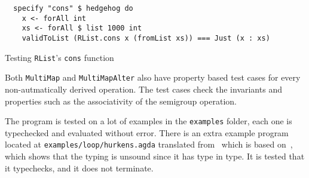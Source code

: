 \begin{listing}
  \begin{verbatim}
  specify "cons" $ hedgehog do
    x <- forAll int
    xs <- forAll $ list 1000 int
    validToList (RList.cons x (fromList xs)) === Just (x : xs)
  \end{verbatim}
  \caption{Testing \texttt{RList}'s \texttt{cons} function
  }\label{lst:rlist-cons}
\end{listing}

Both \texttt{MultiMap} and \texttt{MultiMapAlter} also have
property based test cases for every non-autmatically derived operation. The test
cases check the invariants and properties such as the associativity of the
semigroup operation.

The program is tested on a lot of examples in the \texttt{examples} folder, each
one is typechecked and evaluated without error. There is an extra example program located at \texttt{examples/loop/hurkens.agda} translated
from~\cite{hurkens-Agda} which is based on~\cite{hurkens}, which shows that the
typing is unsound since it has type in type. It is tested that it typechecks,
and it does not terminate.
